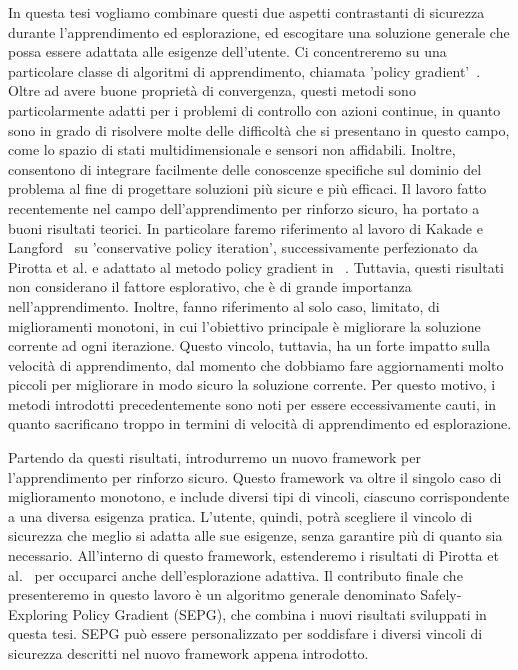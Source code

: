 In questa tesi vogliamo combinare questi due aspetti contrastanti di sicurezza durante l'apprendimento ed esplorazione, ed escogitare una soluzione generale che possa essere adattata alle esigenze dell'utente. Ci concentreremo su una particolare classe di algoritmi di apprendimento, chiamata 'policy gradient'~\cite{peters}. Oltre ad avere buone proprietà di convergenza, questi metodi sono particolarmente adatti per i problemi di controllo con azioni continue, in quanto sono in grado di risolvere molte delle difficoltà che si presentano in questo campo, come lo spazio di stati multidimensionale e sensori non affidabili. Inoltre, consentono di integrare facilmente delle conoscenze specifiche sul dominio del problema al fine di progettare soluzioni più sicure e più efficaci. Il lavoro fatto recentemente nel campo dell'apprendimento per rinforzo sicuro, ha portato a buoni risultati teorici. In particolare faremo riferimento al lavoro di Kakade e Langford~\cite{Kakade02approximatelyoptimal} su 'conservative policy iteration', successivamente perfezionato da Pirotta et al. \cite{safe_iteration} e adattato al metodo policy gradient in ~\cite{adaptive_step}. Tuttavia, questi risultati non considerano il fattore esplorativo, che è di grande importanza nell'apprendimento. Inoltre, fanno riferimento al solo caso, limitato, di miglioramenti monotoni, in cui l'obiettivo principale è migliorare la soluzione corrente ad ogni iterazione. Questo vincolo, tuttavia, ha un forte impatto sulla velocità di apprendimento, dal momento che dobbiamo fare aggiornamenti molto piccoli per migliorare in modo sicuro la soluzione corrente. Per questo motivo, i metodi introdotti precedentemente sono noti per essere eccessivamente cauti, in quanto sacrificano troppo in termini di velocità di apprendimento ed esplorazione.

Partendo da questi risultati, introdurremo un nuovo framework per l'apprendimento per rinforzo sicuro. Questo framework va oltre il singolo caso di miglioramento monotono, e include diversi tipi di vincoli, ciascuno corrispondente a una diversa esigenza pratica. L'utente, quindi, potrà scegliere il vincolo di sicurezza che meglio si adatta alle sue esigenze, senza garantire più di quanto sia necessario. All'interno di questo framework, estenderemo i risultati di Pirotta et al.~\cite{adaptive_step} per occuparci anche dell'esplorazione adattiva. Il contributo finale che presenteremo in questo lavoro è un algoritmo generale denominato Safely-Exploring Policy Gradient (SEPG), che combina i nuovi risultati sviluppati in questa tesi. SEPG può essere personalizzato per soddisfare i diversi vincoli di sicurezza descritti nel nuovo framework appena introdotto.